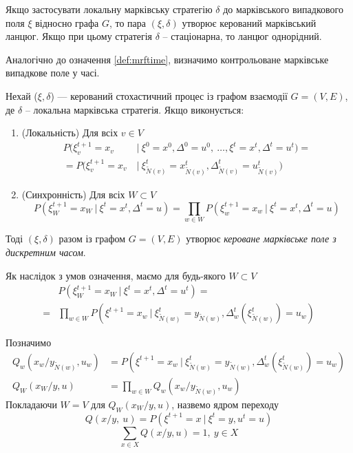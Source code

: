 \documentclass[oneside,14pt]{extarticle}
\begin{document}
Якщо застосувати локальну марківську стратегію \(\delta\) до марківського випадкового поля \(\xi\) відносно графа \(G\), то пара \((\xi, \delta)\) утворює керований марківський ланцюг. Якщо при цьому стратегія \(\delta\) – стаціонарна, то ланцюг однорідний.

	Аналогічно до означення \ref{def:mrftime}, визначимо контрольоване марківське випадкове поле у часі.
	
\begin{definition}
\label{def:ctrlmrftime}
Нехай (\(\xi, \delta \)) — керований стохастичний процес із графом взаємодії \(G = (V, E)\), де \(\delta\) – локальна марківська стратегія. Якщо виконується:
\begin{enumerate}
    \item (Локальність) Для всіх \(v \in V\)
	\begin{align*}
    P(\xi_v^{t+1} = x_v\ &|\ \xi^0 = x^0, \Delta^0 = u^0,\ \ldots, \xi^t = x^t, \Delta^t = u^t) = \\
	= P(\xi_v^{t+1} = x_v\ &|\ \xi_{\tilde N(v)}^t = x_{\tilde N(v)}^t, \Delta_{\tilde N(v)}^t = u_{\tilde N(v)}^t)
	\end{align*}
	\item (Синхронність) Для всіх \(W \subset V\)
	\[P(\xi^{t+1}_W = x_W\ |\ \xi^t = x^t, \Delta^t = u) = \prod_{w \in W} P(\xi^{t+1}_w = x_w\ |\ \xi^t = x^t, \Delta^t = u) \]
\end{enumerate}
Тоді \((\xi, \delta)\) разом із графом \(G=(V,E)\) утворює \textit{кероване марківське поле з дискретним часом}.
\end{definition}

Як наслідок з умов означення, маємо для будь-якого \(W \subset V\)
\begin{align*}
&P(\xi_W^{t+1} = x_W\ |\ \xi^t = x^t, \Delta^t = u^t) = \\
= &\prod_{w \in W} P(\xi^{t+1} = x_w\ |\ \xi_{\tilde{N}(w)}^t = y_{\tilde{N}(w)}, \Delta_w^t(\xi_{\tilde{N}(w)}^t) = u_w)
\end{align*}

\begin{definition} 
Позначимо
\begin{align*}
Q_w(x_w / y_{\tilde{N}(w)}, u_w) &= P(\xi^{t+1} = x_w\ |\ \xi_{\tilde{N}(w)}^t = y_{\tilde{N}(w)}, \Delta_w^t(\xi_{\tilde{N}(w)}^t) = u_w) \\
Q_W(x_W / y, u) &= \prod_{w \in W} Q_w(x_w / y_{\tilde{N}(w)}, u_w)
\end{align*}
Покладаючи \(W = V\) для \( Q_W(x_W / y, u) \), назвемо ядром переходу
\[Q(x/y,\ u) = P(\xi^{t+1} = x\ |\ \xi^t = y, u^t = u)\]
\[\sum_{x \in X}Q(x/y, u) = 1,\ y \in X\]
\end{definition}
\end{document}
